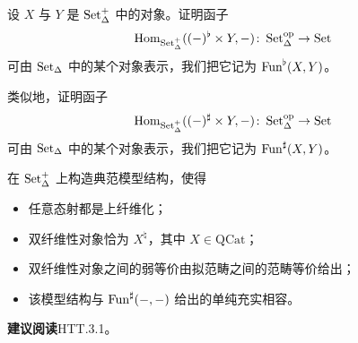 \begin{exercise}\label{L8-A.3}
设 $X$ 与 $Y$ 是 $\operatorname{Set}^+_\Delta$ 中的对象。证明函子
\[
\operatorname{Hom}_{\operatorname{Set}^+_\Delta}((-)^\flat\times Y,-)\colon \operatorname{Set}_\Delta^{\mathrm{op}}\to \operatorname{Set}
\]
可由 $\operatorname{Set}_\Delta$ 中的某个对象表示，我们把它记为 $\operatorname{Fun}^\flat(X,Y)$。

类似地，证明函子
\[
\operatorname{Hom}_{\operatorname{Set}^+_\Delta}((-)^\sharp\times Y,-)\colon \operatorname{Set}_\Delta^{\mathrm{op}}\to \operatorname{Set}
\]
可由 $\operatorname{Set}_\Delta$ 中的某个对象表示，我们把它记为 $\operatorname{Fun}^\sharp(X,Y)$。
\end{exercise}

\begin{exercise}\label{L8-A.4}
在 $\operatorname{Set}^+_\Delta$ 上构造典范模型结构，使得
\begin{itemize}[leftmargin=2.2em,itemsep=0.1em]
\item 任意态射都是上纤维化；
\item 双纤维性对象恰为 $X^\natural$，其中 $X\in\mathrm{QCat}$；
\item 双纤维性对象之间的弱等价由拟范畴之间的范畴等价给出；
\item 该模型结构与 $\operatorname{Fun}^\sharp(-,-)$ 给出的单纯充实相容。
\end{itemize}
\end{exercise}

\nitem\label{L8-A.5} \textbf{建议阅读}\quad HTT.3.1。
